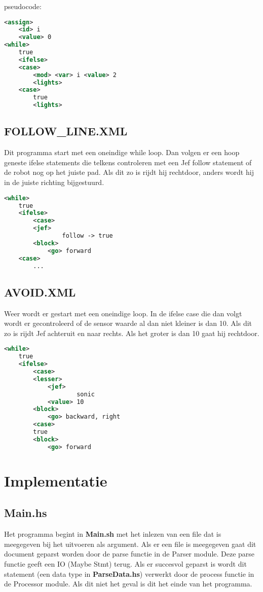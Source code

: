 \documentclass[]{article}
\begin{document}
\-

pseudocode:
\begin{lstlisting}[language=XML]
<assign>
	<id> i
	<value> 0
<while>
	true
	<ifelse>
	<case>
		<mod> <var> i <value> 2
		<lights> 
	<case>
		true
		<lights>
\end{lstlisting}


 \subsection{FOLLOW\_LINE.XML}
Dit programma start met een oneindige while loop. Dan volgen er een hoop geneste ifelse statements die telkens controleren met een Jef follow statement of de robot nog op het juiste pad. Als dit zo is rijdt hij rechtdoor, anders wordt hij in de juiste richting bijgestuurd.

\begin{lstlisting}[language=XML]
<while>
	true
	<ifelse>
		<case>
		<jef>
	    		follow -> true
		<block>
			<go> forward
	<case>
		...
\end{lstlisting}

 \newpage
 \subsection{AVOID.XML}
Weer wordt er gestart met een oneindige loop. In de ifelse case die dan volgt wordt er gecontroleerd of de sensor waarde al dan niet kleiner is dan 10. Als dit zo is rijdt Jef achteruit en naar rechts. Als het groter is dan 10 gaat hij rechtdoor.
\begin{lstlisting}[language=XML]
<while>
	true
	<ifelse>
		<case>
		<lesser>
			<jef>
	    			sonic
			<value> 10
		<block>
			<go> backward, right
		<case>
		true
		<block>
			<go> forward
\end{lstlisting}



\section{Implementatie}
\subsection{Main.hs}
Het programma begint in \textbf{Main.sh} met het inlezen van een file dat is meegegeven bij het uitvoeren als argument. Als er een file is meegegeven gaat dit document geparst worden door de parse functie in de Parser module. Deze parse functie geeft een IO (Maybe Stmt) terug. Als er succesvol geparst is wordt dit statement (een data type in  \textbf{ParseData.hs}) verwerkt door  de process functie in de Processor module. Als dit niet het geval is dit het einde van het programma. 
\end{document}
